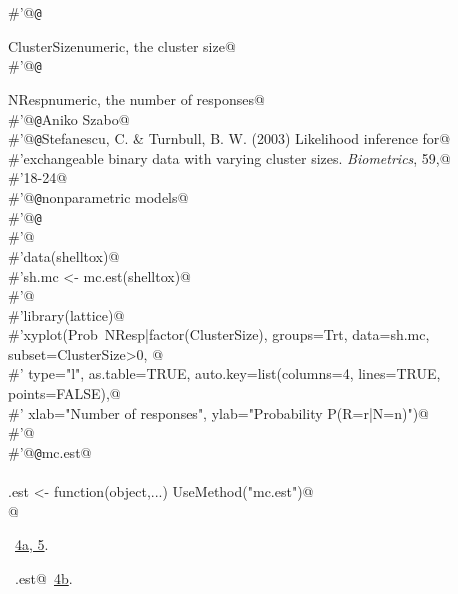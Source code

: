\documentclass[reqno]{amsart}
\renewcommand{\NWlink}[2]{\hyperlink{#1}{#2}}
\begin{document}
\begin{flushleft}
\begin{minipage}{\linewidth}
\begin{list}{}{}
\mbox{}\verb@#'@{\tt @}\verb@return \item{ClusterSize}{numeric, the cluster size}@\\
\mbox{}\verb@#'@{\tt @}\verb@return \item{NResp}{numeric, the number of responses}@\\
\mbox{}\verb@#'@{\tt @}\verb@author Aniko Szabo@\\
\mbox{}\verb@#'@{\tt @}\verb@references Stefanescu, C. & Turnbull, B. W. (2003) Likelihood inference for@\\
\mbox{}\verb@#'exchangeable binary data with varying cluster sizes.  \emph{Biometrics}, 59,@\\
\mbox{}\verb@#'18-24@\\
\mbox{}\verb@#'@{\tt @}\verb@keywords nonparametric models@\\
\mbox{}\verb@#'@{\tt @}\verb@examples@\\
\mbox{}\verb@#'@\\
\mbox{}\verb@#'data(shelltox)@\\
\mbox{}\verb@#'sh.mc <- mc.est(shelltox)@\\
\mbox{}\verb@#'@\\
\mbox{}\verb@#'library(lattice)@\\
\mbox{}\verb@#'xyplot(Prob~NResp|factor(ClusterSize), groups=Trt, data=sh.mc, subset=ClusterSize>0, @\\
\mbox{}\verb@#'    type="l", as.table=TRUE, auto.key=list(columns=4, lines=TRUE, points=FALSE),@\\
\mbox{}\verb@#'    xlab="Number of responses", ylab="Probability P(R=r|N=n)")@\\
\mbox{}\verb@#'@\\
\mbox{}\verb@#'@{\tt @}\verb@name mc.est@\\
\mbox{}\verb@@\\
\mbox{}\verb@mc.est <- function(object,...) UseMethod("mc.est")@\\
\mbox{}\verb@ @\\
\mbox{}\verb@@{\NWsep}
\end{list}
\vspace{-1.5ex}
\footnotesize
\begin{list}{}{\setlength{\itemsep}{-\parsep}\setlength{\itemindent}{-\leftmargin}}
\item \NWtxtFileDefBy\ \NWlink{nuweb4a}{4a}\NWlink{nuweb5}{, 5}.
\item \NWtxtIdentsUsed\nobreak\  \verb@mc.est@\nobreak\ \NWlink{nuweb4b}{4b}.
\item{}
\end{list}
\end{minipage}\vspace{4ex}
\end{flushleft}
\end{document}
